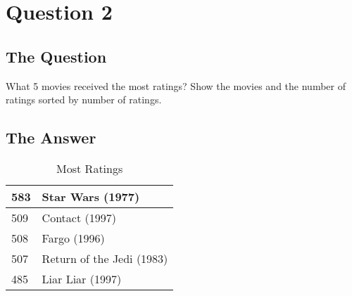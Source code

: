 \section{Question 2}

\subsection{The Question}

\begin{flushleft}

What 5 movies received the most ratings? Show the movies and
the number of ratings sorted by number of ratings.

\end{flushleft}
\subsection{The Answer}


\begin{flushleft}

\begin{table}[h]
\centering
\begin{tabular}{ll}
583 & Star Wars (1977)          \\ \hline
509 & Contact (1997)            \\ \hline
508 & Fargo (1996)              \\ \hline
507 & Return of the Jedi (1983) \\ \hline
485 & Liar Liar (1997)         
\end{tabular}
\caption{Most Ratings}
\end{table}
\end{flushleft}




